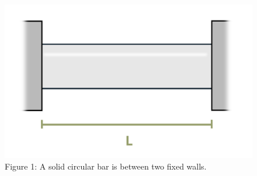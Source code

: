 \documentclass[
  letterpaper,
  DIV=11,
  numbers=noendperiod]{scrreprt}
\begin{document}
\begin{figure}[H]

{\centering \includegraphics{images/222.png}

}

\caption{Figure 1: A solid circular bar is between two fixed walls.}

\end{figure}%
\end{document}
